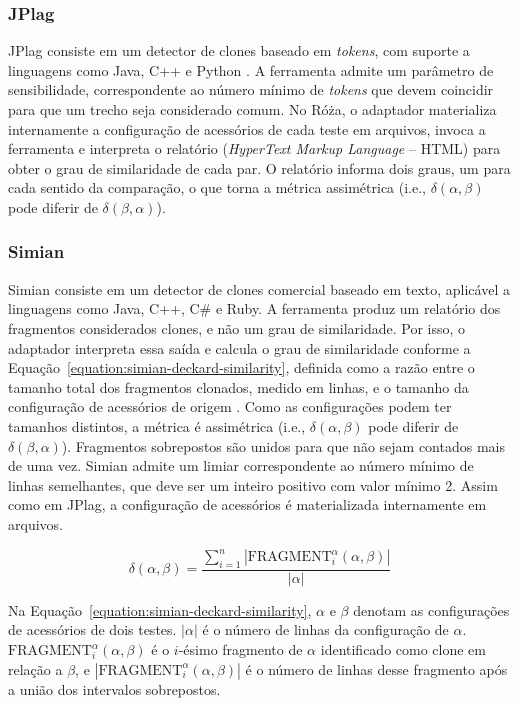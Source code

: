 \subsubsection{JPlag}

JPlag consiste em um detector de clones baseado em \textit{tokens}, com suporte a linguagens como Java, C++ e Python \cite{prechelt:etal:2002}. A ferramenta admite um parâmetro de sensibilidade, correspondente ao número mínimo de \textit{tokens} que devem coincidir para que um trecho seja considerado comum. No Róża, o adaptador materializa internamente a configuração de acessórios de cada teste em arquivos, invoca a ferramenta e interpreta o relatório (\textit{HyperText Markup Language} -- HTML) para obter o grau de similaridade de cada par. O relatório informa dois graus, um para cada sentido da comparação, o que torna a métrica assimétrica (i.e., $\delta(\alpha, \beta)$ pode diferir de $\delta(\beta, \alpha)$).

\subsubsection{Simian}

Simian consiste em um detector de clones comercial baseado em texto, aplicável a linguagens como Java, C++, C\# e Ruby. A ferramenta produz um relatório dos fragmentos considerados clones, e não um grau de similaridade. Por isso, o adaptador interpreta essa saída e calcula o grau de similaridade conforme a Equação~\ref{equation:simian-deckard-similarity}, definida como a razão entre o tamanho total dos fragmentos clonados, medido em linhas, e o tamanho da configuração de acessórios de origem \cite{ragkhitwetsagul:etal:2018}. Como as configurações podem ter tamanhos distintos, a métrica é assimétrica (i.e., $\delta(\alpha, \beta)$ pode diferir de $\delta(\beta, \alpha)$). Fragmentos sobrepostos são unidos para que não sejam contados mais de uma vez. Simian admite um limiar correspondente ao número mínimo de linhas semelhantes, que deve ser um inteiro positivo com valor mínimo 2. Assim como em JPlag, a configuração de acessórios é materializada internamente em arquivos.

\begin{equation}
	\label{equation:simian-deckard-similarity}
	\delta(\alpha, \beta) = \frac{\sum_{i=1}^{n} \left|\mathrm{FRAGMENT}_{i}^{\alpha}(\alpha, \beta)\right|}{\left|\alpha\right|}
\end{equation}

Na Equação~\ref{equation:simian-deckard-similarity}, $\alpha$ e $\beta$ denotam as configurações de acessórios de dois testes. $|\alpha|$ é o número de linhas da configuração de $\alpha$. $\mathrm{FRAGMENT}_{i}^{\alpha}(\alpha, \beta)$ é o $i$-ésimo fragmento de $\alpha$ identificado como clone em relação a $\beta$, e $|\mathrm{FRAGMENT}_{i}^{\alpha}(\alpha, \beta)|$ é o número de linhas desse fragmento após a união dos intervalos sobrepostos.

